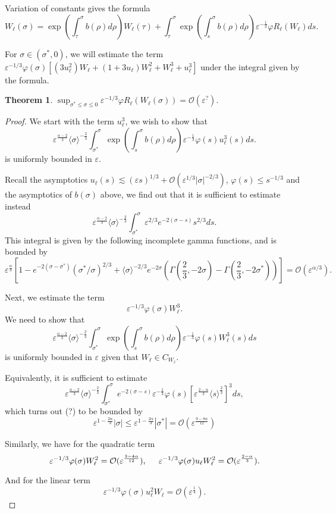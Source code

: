 \documentclass[letterpaper,11pt]{article}
\newcommand{\rmO}{\mathcal{O}}
\newcommand{\eps}{\varepsilon}
\newcommand{\lar}{ \lesssim }
\numberwithin{equation}{section}
\theoremstyle{plain}
\newtheorem{theorem}{Theorem}[section]
\begin{document}
Variation of constants gives the formula
\begin{equation}\label{solution1}
W_\ell(\sigma) = \exp\left(\int_\tau^\sigma b(\rho)d\rho\right)W_\ell(\tau) + \int_\tau^\sigma \exp\left(\int_s^\sigma b(\rho)d\rho\right)\eps^{-\frac{1}{3}}\varphi R_\ell(W_\ell)	 ds.
\end{equation}

For $\sigma \in (\sigma^* , 0)$, we will estimate the term $\eps^{-1/3}\varphi(\sigma)\left[ (3u_\ell^2)W_\ell + (1+3u_\ell)W_\ell^2 + W_\ell^3+u_\ell^3\right]$ under the integral given by the formula.

\begin{theorem}
$\sup_{\sigma^* \le \sigma \le 0} \eps^{-1/3}\varphi R_\ell(W_\ell(\sigma)) = \rmO(\eps^{?})$.
\end{theorem}

\begin{proof}
We start with the term $u_\ell^3$, we wish to show that
\[
\eps^{\frac{\alpha-2}{3}} \langle \sigma \rangle^{-\frac{2}{3}}\int_{\sigma^*}^\sigma \exp\left(\int_s^\sigma b(\rho)d\rho\right)\eps^{-\frac{1}{3}}\varphi(s) u_\ell^3(s) ds.
\]
is uniformly bounded in $\eps$.

Recall the asymptotics $u_\ell(s) \lar (\eps s)^{1/3} + \rmO(\eps^{1/3}|\sigma|^{-2/3})$, $\varphi(s) \le s^{-1/3}$ and the asymptotics of $b(\sigma)$ above, we find out that it is sufficient to estimate instead
\[
\eps^{\frac{\alpha-2}{3}} \langle \sigma \rangle^{-\frac{2}{3}} \int_{\sigma^*}^{\sigma}\eps^{2/3}e^{-2(\sigma-s)} s^{2/3}ds.
\]
This integral is given by the following incomplete gamma functions, and is bounded by
\[
\eps^{\frac{\alpha}{3}} \left[1-e^{-2(\sigma-\sigma^*)} (\sigma^*/\sigma)^{2/3}+ \langle \sigma\rangle^{-2/3}e^{-2\sigma}\left(\Gamma(\frac{2}{3},-2\sigma) -\Gamma (\frac{2}{3},-2\sigma^*) \right)\right] = \rmO(\eps^{\alpha/3}).
\]

Next, we estimate the term
\[
\eps^{-1/3}\varphi(\sigma) W_\ell^3.
\]
We need to show that
\[
\eps^{\frac{\alpha-2}{3}}\langle \sigma \rangle^{-\frac{2}{3}}\int_{\sigma^*}^{\sigma} \exp\left( \int_s^\sigma b(\rho)d\rho\right) \eps^{-\frac{1}{3}}\varphi(s)W_{\ell}^3(s)ds
\]
is uniformly bounded in $\eps$ given that $W_\ell \in C_{W_\ell}$.

Equivalently, it is sufficient to estimate
\[
\eps^{\frac{\alpha-2}{3}} \langle \sigma \rangle^{-\frac{2}{3}} \int_{\sigma^*}^\sigma e^{-2(\sigma-s)} \eps^{-\frac{1}{3}}\varphi (s)[\eps^{\frac{2-\alpha}{3}} \langle s \rangle^{\frac{2}{3}}]^3 ds,
\]
which turns out (?) to be bounded by
\[
\eps^{1-\frac{2\alpha}{3}} |\sigma| \le \eps^{1-\frac{2\alpha}{3}} |\sigma^*| = \rmO( \eps^{\frac{9-8\alpha}{12}} )
\]

Similarly, we have for the quadratic term
\[
\eps^{-1/3}\varphi(\sigma) W_\ell^2 = \rmO(\eps^{\frac{3-4\alpha}{12}} ), \hspace{0.2in} \eps^{-1/3}\varphi(\sigma)u_{\ell}W_{\ell}^2 =  \rmO(\eps^{\frac{2-\alpha}{3}}).
\]

And for the linear term
\[
\eps^{-1/3}\varphi(\sigma) u_\ell^2W_\ell = \rmO(\eps^{\frac{1}{4}}).
\]
\end{proof}
\end{document}
